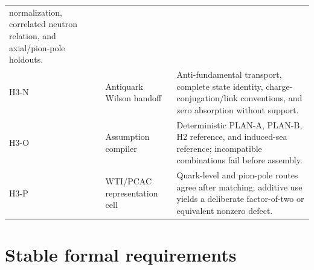 \documentclass[11pt]{article}
\begin{document}
\begin{longtable}{L{0.12\textwidth}L{0.28\textwidth}L{0.50\textwidth}}
normalization, correlated neutron relation, and axial/pion-pole holdouts.\\
H3-N & Antiquark Wilson handoff & Anti-fundamental transport, complete state
identity, charge-conjugation/link conventions, and zero absorption without
support.\\
H3-O & Assumption compiler & Deterministic PLAN-A, PLAN-B, H2 reference, and
induced-sea reference; incompatible combinations fail before assembly.\\
H3-P & WTI/PCAC representation cell & Quark-level and pion-pole routes agree
after matching; additive use yields a deliberate factor-of-two or equivalent
nonzero defect.\\
\bottomrule
\end{longtable}

\section{Stable formal requirements}
\label{sec:requirements}
\end{document}
